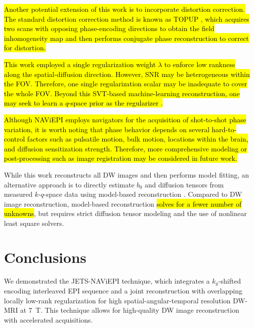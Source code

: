 \documentclass[preprint,12pt,authoryear,review]{elsarticle}
\begin{document}
    \hl{Another potential extension of this work is
    to incorporate distortion correction.
    The standard distortion correction method is
    known as TOPUP \mbox{\citep{andersson_2003_topup}},
    which acquires two scans
    with opposing phase-encoding directions to
    obtain the field inhomogeneity map and
    then performs conjugate phase reconstruction
    to correct for distortion.}

    \hl{This work employed a single regularization weight \mbox{$\lambda$}
    to enforce low rankness along the spatial-diffusion direction.
    However, SNR may be heterogeneous within the FOV.
    Therefore, one single regularization scalar may be inadequate
    to cover the whole FOV.
    Beyond this SVT-based machine-learning reconstruction,
    one may seek to learn a $q$-space prior as the regularizer
    \mbox{\citep{hammernik_2018_varnet,mani_2021_qmodel}}.}


    \hl{Although NAViEPI employs navigators for
    the acquisition of shot-to-shot phase variation,
    it is worth noting that phase behavior depends on
    several hard-to-control factors
    such as pulsatile motion, bulk motion,
    locations within the brain, and
    diffusion sensitization strength.
    Therefore, more comprehensive modeling or post-processing
    such as image registration may be considered in future work.}

    While this work reconstructs all DW images and
    then performs model fitting,
    an alternative approach is to directly estimate
    $b_0$ and diffusion tensors
    from measured $k$-$q$-space data
    using model-based reconstruction
    \citep{knoll_2015_mobadiff,dong_2018_mobadiff,shafieizargar_2023_adept}.
    Compared to DW image reconstruction,
    model-based reconstruction \hl{solves for a fewer number of unknowns}, 
    but requires strict diffusion tensor modeling
    and the use of nonlinear least square solvers.

    \section{Conclusions}
    \label{SEC:Conc}

    We demonstrated the JETS-NAViEPI technique, which integrates
    a $k_y$-shifted encoding interleaved EPI sequence and
    a joint reconstruction with overlapping locally low-rank regularization
    for high spatial-angular-temporal resolution DW-MRI at \SI{7}{\tesla}.
    This technique allows for high-quality DW image reconstruction
    with accelerated acquisitions.
\end{document}
